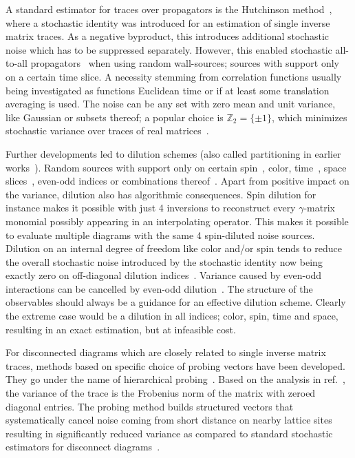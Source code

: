 A standard estimator for traces over propagators is the Hutchinson method~\cite{Hutchinson01011990}, where a stochastic identity was introduced for an estimation of single inverse matrix traces.
As a negative byproduct, this introduces additional stochastic noise which has to be suppressed separately.
However, this enabled stochastic all-to-all propagators~\cite{Foley:2005ac} when using random wall-sources; sources with support only on a certain time slice.
A necessity stemming from correlation functions usually being investigated as functions Euclidean time or if at least some translation averaging is used.
The noise can be any set with zero mean and unit variance, like Gaussian or subsets thereof; a popular choice is $\mathbb{Z}_2 = \{\pm 1\}$, which minimizes stochastic variance over traces of real matrices~\cite{Bernardson:1993he}.

Further developments led to dilution schemes (also called partitioning in earlier works~\cite{Wilcox:1999ab}).
Random sources with support only on certain spin~\cite{Wilcox:1997rm,Alexandrou:2010jr}, color, time~\cite{GUSKEN1989,OCais:2004xgm,Bali:2014pva}, space slices~\cite{Foley:2005ac}, even-odd indices or combinations thereof~\cite{Morningstar:2008mc,Bulava:2008qx,Foley:2010vv,Morningstar:2008ph}.
Apart from positive impact on the variance, dilution also has algorithmic consequences.
Spin dilution for instance makes it possible with just \num{4} inversions to reconstruct every $\gamma$-matrix monomial possibly appearing in an interpolating operator.
This makes it possible to evaluate multiple diagrams with the same \num{4} spin-diluted noise sources.
Dilution on an internal degree of freedom like color and/or spin tends to reduce the overall stochastic noise introduced by the stochastic identity now being exactly zero on off-diagonal dilution indices~\cite{Babich:2010at,Morningstar:2011ka}.
Variance caused by even-odd interactions can be cancelled by even-odd dilution~\cite{Bali_2009,Foley:2005ac,Morningstar:2011ka}.
The structure of the observables should always be a guidance for an effective dilution scheme.
Clearly the extreme case would be a dilution in all indices; color, spin, time and space, resulting in an exact estimation, but at infeasible cost.

For disconnected diagrams which are closely related to single inverse matrix traces, methods based on specific choice of probing vectors have been developed.
They go under the name of hierarchical probing~\cite{tang2012probing,Stathopoulos:2013aci}.
Based on the analysis in ref.~\cite{Hutchinson01011990}, the variance of the trace is the Frobenius norm of the matrix with zeroed diagonal entries.
The probing method builds structured vectors that systematically cancel noise coming from short distance on nearby lattice sites resulting in significantly reduced variance as compared to standard stochastic estimators for disconnect diagrams~\cite{Stathopoulos:2013aci}.

